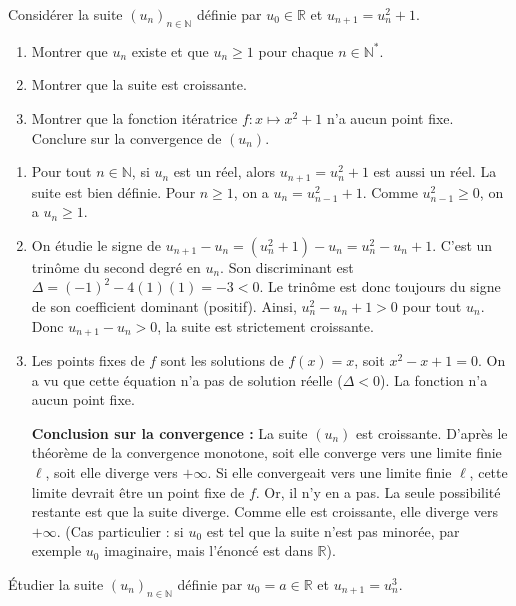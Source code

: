 \documentclass[solutions]{exercices}
\begin{document}
\begin{exercice}
Considérer la suite $(u_n)_{n \in \mathbb{N}}$ définie par $u_0\in\mathbb{R}$ et $u_{n+1}=u_n^2+1$.
\begin{enumerate}
    \item Montrer que $u_n$ existe et que $u_n\geq1$ pour chaque $n\in\mathbb{N}^*.$
    \item Montrer que la suite est croissante.
    \item Montrer que la fonction itératrice $f:x\mapsto x^2 +1$ n'a aucun point fixe. Conclure sur la convergence de $(u_n)$.
\end{enumerate}
\end{exercice}

\begin{solution}
\begin{enumerate}
    \item Pour tout $n \in \mathbb{N}$, si $u_n$ est un réel, alors $u_{n+1}=u_n^2+1$ est aussi un réel. La suite est bien définie.
    Pour $n \ge 1$, on a $u_n = u_{n-1}^2+1$. Comme $u_{n-1}^2 \ge 0$, on a $u_n \ge 1$.
    \item On étudie le signe de $u_{n+1}-u_n = (u_n^2+1)-u_n = u_n^2 - u_n + 1$.
    C'est un trinôme du second degré en $u_n$. Son discriminant est $\Delta = (-1)^2 - 4(1)(1) = -3 < 0$.
    Le trinôme est donc toujours du signe de son coefficient dominant (positif).
    Ainsi, $u_n^2-u_n+1 > 0$ pour tout $u_n$.
    Donc $u_{n+1}-u_n > 0$, la suite est strictement croissante.
    \item Les points fixes de $f$ sont les solutions de $f(x)=x$, soit $x^2-x+1=0$.
    On a vu que cette équation n'a pas de solution réelle ($\Delta < 0$). La fonction n'a aucun point fixe.
    
    \textbf{Conclusion sur la convergence :}
    La suite $(u_n)$ est croissante. D'après le théorème de la convergence monotone, soit elle converge vers une limite finie $\ell$, soit elle diverge vers $+\infty$.
    Si elle convergeait vers une limite finie $\ell$, cette limite devrait être un point fixe de $f$. Or, il n'y en a pas.
    La seule possibilité restante est que la suite diverge. Comme elle est croissante, elle diverge vers $+\infty$.
    (Cas particulier : si $u_0$ est tel que la suite n'est pas minorée, par exemple $u_0$ imaginaire, mais l'énoncé est dans $\mathbb{R}$).
\end{enumerate}
\end{solution}

\begin{exercice}
\'Etudier la suite $(u_n)_{n \in \mathbb{N}}$ définie par $u_0=a\in\mathbb{R}$ et $u_{n+1}=u_n^3$.
\end{exercice}
\end{document}
